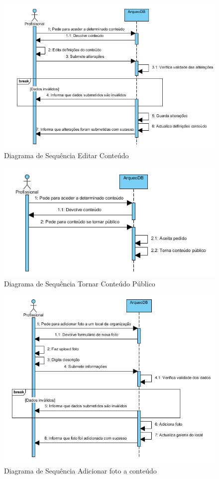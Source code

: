 ﻿\documentclass[12pt,a4paper]{article}
\begin{document}
\begin{figure}[h!]
\centering
\includegraphics[scale=0.8]{sequencia/editarconteudo}
\caption{Diagrama de Sequência Editar Conteúdo} 
\end{figure}


 
\begin{figure}[h!]
\centering
\includegraphics[scale=1]{sequencia/tornarpublico}
\caption{Diagrama de Sequência Tornar Conteúdo Público} 
\end{figure}  


\begin{figure}[h!]
\centering
\includegraphics[scale=1]{sequencia/P_adicionarfoto}
\caption{Diagrama de Sequência Adicionar foto a conteúdo} 
\end{figure} 
 
\end{document}
